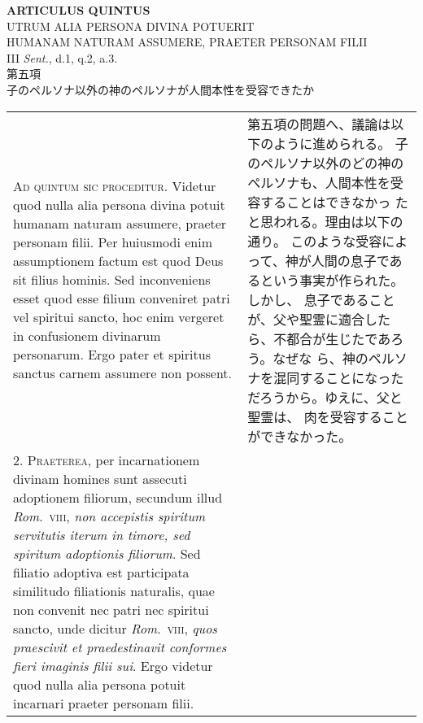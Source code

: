 \documentclass[10pt]{jsarticle} %
\begin{document}
\begin{center}
 {\Large {\bf ARTICULUS QUINTUS}}\\
 {\large UTRUM ALIA PERSONA DIVINA POTUERIT\\HUMANAM NATURAM ASSUMERE,
 PRAETER PERSONAM FILII}\\
 {\footnotesize III {\itshape Sent.}, d.1, q.2, a.3.}\\
 {\Large 第五項\\子のペルソナ以外の神のペルソナが人間本性を受容できたか}
\end{center}

\begin{longtable}{p{21em}p{21em}}

{\Huge A}{\scshape d quintum sic proceditur}. Videtur quod nulla alia persona divina potuit
humanam naturam assumere, praeter personam filii. Per huiusmodi enim
assumptionem factum est quod Deus sit filius hominis. Sed inconveniens
esset quod esse filium conveniret patri vel spiritui sancto, hoc enim
vergeret in confusionem divinarum personarum. Ergo pater et spiritus
sanctus carnem assumere non possent.


&

第五項の問題へ、議論は以下のように進められる。
子のペルソナ以外のどの神のペルソナも、人間本性を受容することはできなかっ
 たと思われる。理由は以下の通り。
このような受容によって、神が人間の息子であるという事実が作られた。しかし、
 息子であることが、父や聖霊に適合したら、不都合が生じたであろう。なぜな
 ら、神のペルソナを混同することになっただろうから。ゆえに、父と聖霊は、
 肉を受容することができなかった。


\\



2. {\scshape Praeterea}, per incarnationem divinam homines sunt assecuti adoptionem
filiorum, secundum illud {\itshape Rom}.~{\scshape viii}, {\itshape non accepistis spiritum servitutis
iterum in timore, sed spiritum adoptionis filiorum}. Sed filiatio
adoptiva est participata similitudo filiationis naturalis, quae non
convenit nec patri nec spiritui sancto, unde dicitur {\itshape Rom}.~{\scshape viii}, {\itshape quos
praescivit et praedestinavit conformes fieri imaginis filii sui}. Ergo
videtur quod nulla alia persona potuit incarnari praeter personam filii.


&


\end{longtable}
\end{document}
